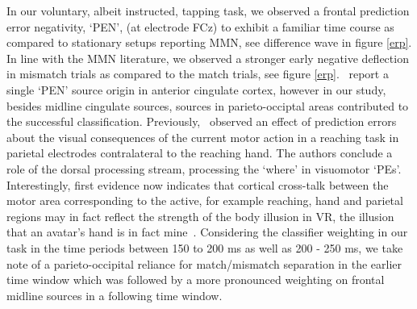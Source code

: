 In our voluntary, albeit instructed, tapping task, we observed a frontal prediction error negativity, `PEN', (at electrode FCz) to exhibit a familiar time course as compared to stationary setups reporting MMN, see difference wave in figure \ref{erp}. In line with the MMN literature, we observed a stronger early negative deflection in mismatch trials as compared to the match trials, see figure \ref{erp}.~\cite{Zander2016-ed} report a single `PEN' source origin in anterior cingulate cortex, however in our study, besides midline cingulate sources, sources in parieto-occiptal areas contributed to the successful classification. Previously,~\cite{Savoie2018-ad} observed an effect of prediction errors about the visual consequences of the current motor action in a reaching task in parietal electrodes contralateral to the reaching hand. The authors conclude a role of the dorsal processing stream, processing the `where' in visuomotor `PEs'. \textcolor{n}{Interestingly, first evidence now indicates that cortical cross-talk between the motor area corresponding to the active, for example reaching, hand and parietal regions may in fact reflect the strength of the body illusion in VR, the illusion that an avatar's hand is in fact mine~\cite{Casula2022-tq}}. Considering the classifier weighting in our task in the time periods between 150 to 200 ms as well as 200 - 250 ms, we take note of a parieto-occipital reliance for match/mismatch separation in the earlier time window which was followed by a more pronounced weighting on frontal midline sources in a following time window.

